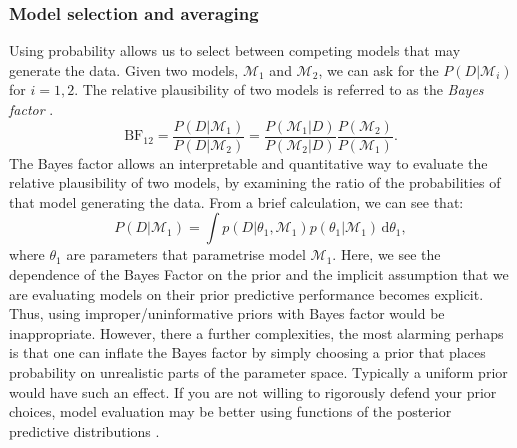 \documentclass[12pt,english]{article}
\begin{document}
\subsubsection{Model selection and averaging}
Using probability allows us to select between competing models that may generate the data. Given two models, $\mathcal{M}_1$ and $\mathcal{M}_2$, we can ask for the $P(D| \mathcal{M}_i)$ for $i = 1,2$. The relative plausibility of two models is referred to as the \textit{Bayes factor} \citep{Kass::1995}.
\begin{equation}
\text{BF}_{12} = \frac{P(D|\mathcal{M}_1)}{P(D|\mathcal{M}_2)} = \frac{P(\mathcal{M}_1|D)}{P(\mathcal{M}_2|D)}\frac{P(\mathcal{M}_2)}{P(\mathcal{M}_1)}. 
\end{equation}   
The Bayes factor allows an interpretable and quantitative way to evaluate the relative plausibility of two models, by examining the ratio of the probabilities of that model generating the data. From a brief calculation, we can see that:
\begin{equation}
P(D|\mathcal{M}_1) = \int p(D|\theta_1, \mathcal{M}_1)p(\theta_1|\mathcal{M}_1)\, \text{d}\theta_1,
\end{equation}   
where $\theta_1$ are parameters that parametrise model $\mathcal{M}_1$. Here, we see the dependence of the Bayes Factor on the prior and the implicit assumption that we are evaluating models on their prior predictive performance becomes explicit. Thus, using improper/uninformative priors with Bayes factor would be inappropriate. However, there a further complexities, the most alarming perhaps is that one can inflate the Bayes factor by simply choosing a prior that places probability on unrealistic parts of the parameter space. Typically a uniform prior would have such an effect. If you are not willing to rigorously defend your prior choices, model evaluation may be better using functions of the posterior predictive distributions \citep{Betancourt::2021}. 
\end{document}
